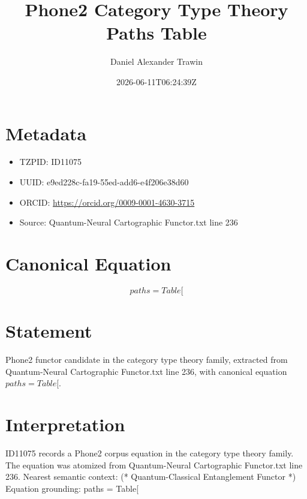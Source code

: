 \documentclass[11pt]{article}
\title{Phone2 Category Type Theory Paths Table}
\author{Daniel Alexander Trawin}
\date{2026-06-11T06:24:39Z}
\begin{document}
\maketitle
\section*{Metadata}
\begin{itemize}
\item TZPID: ID11075
\item UUID: e9ed228c-fa19-55ed-add6-e4f206e38d60
\item ORCID: \url{https://orcid.org/0009-0001-4630-3715}
\item Source: Quantum-Neural Cartographic Functor.txt line 236
\end{itemize}
\section*{Canonical Equation}
\[
paths = Table[
\]
\section*{Statement}
Phone2 functor candidate in the category type theory family, extracted from Quantum-Neural Cartographic Functor.txt line 236, with canonical equation $paths = Table[$.
\section*{Interpretation}
ID11075 records a Phone2 corpus equation in the category type theory family. The equation was atomized from Quantum-Neural Cartographic Functor.txt line 236. Nearest semantic context: (* Quantum-Classical Entanglement Functor *) Equation grounding: paths = Table[
\end{document}

